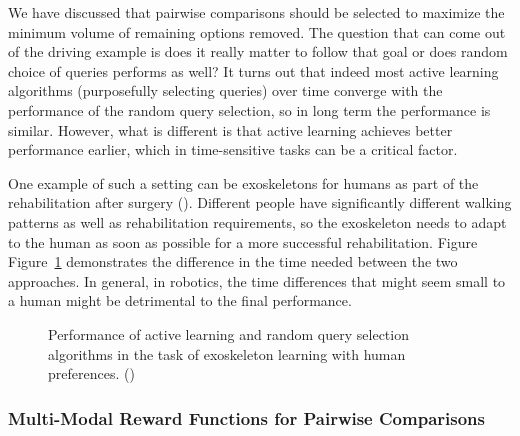 \documentclass[
  letterpaper,
  numbers=noenddot,
  DIV=11]{scrreprt}
\theoremstyle{definition}
\theoremstyle{plain}
\theoremstyle{plain}
\theoremstyle{remark}
\begin{document}
We have discussed that pairwise comparisons should be selected to
maximize the minimum volume of remaining options removed. The question
that can come out of the driving example is does it really matter to
follow that goal or does random choice of queries performs as well? It
turns out that indeed most active learning algorithms (purposefully
selecting queries) over time converge with the performance of the random
query selection, so in long term the performance is similar. However,
what is different is that active learning achieves better performance
earlier, which in time-sensitive tasks can be a critical factor.

One example of such a setting can be exoskeletons for humans as part of
the rehabilitation after surgery (). Different people have significantly different walking patterns
as well as rehabilitation requirements, so the exoskeleton needs to
adapt to the human as soon as possible for a more successful
rehabilitation. Figure Figure~\ref{fig-robotics} demonstrates the
difference in the time needed between the two approaches. In general, in
robotics, the time differences that might seem small to a human might be
detrimental to the final performance.

\begin{figure}


\caption{\label{fig-robotics}Performance of active learning and random
query selection algorithms in the task of exoskeleton learning with
human preferences. ()}

\end{figure}%

\subsubsection*{Multi-Modal Reward Functions for Pairwise
Comparisons}\label{multi-modal-reward-functions-for-pairwise-comparisons}
\end{document}
